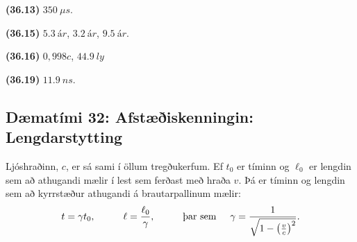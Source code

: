 \begin{tcolorbox}
\begin{enumerate*}[label = ]
  \item \textbf{(36.13)} $\SI{350}{\mu s}$.
  \item \textbf{(36.15)} $\SI{5,3}{ár}$, $\SI{3,2}{ár}$, $\SI{9,5}{ár}$.
  \item \textbf{(36.16)} $0,998c$, $\SI{44,9}{ly}$
  \item \textbf{(36.19)} $\SI{11.9}{ns}$.
\end{enumerate*}
\end{tcolorbox}

\newpage

\subsection*{Dæmatími 32: Afstæðiskenningin: Lengdarstytting}

\begin{tcolorbox}
Ljóshraðinn, $c$, er sá sami í öllum tregðukerfum. Ef $t_0$ er tíminn og $\ell_0$ er lengdin sem að athugandi mælir í lest sem ferðast með hraða $v$. Þá er tíminn og lengdin sem að kyrrstæður athugandi á brautarpallinum mælir:
\begin{align*}
    t = \gamma t_0, \hspace{1cm} \ell = \frac{\ell_0}{\gamma}, \hspace{1cm} \text{þar sem} \hspace{0.5cm} \gamma = \frac{1}{\sqrt{1-\left(\frac{v}{c}\right)^2}}.
\end{align*}
\end{tcolorbox}

